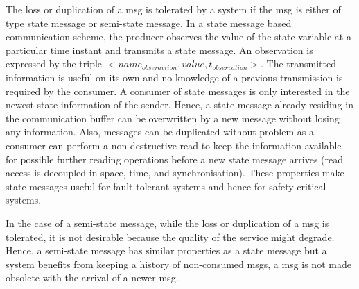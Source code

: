 The loss or duplication of a \gls*{msg} is tolerated by a system if the \gls*{msg} is either of type state message or semi-state message.
In a state message based communication scheme, the producer observes the value of the state variable at a particular time instant and transmits a state message.
An observation is expressed by the triple $<name_{obseravtion}, value, t_{observation}>$.
The transmitted information is useful on its own and no knowledge of a previous transmission is required by the consumer.
A consumer of state messages is only interested in the newest state information of the sender.
Hence, a state message already residing in the communication buffer can be overwritten by a new message without losing any information.
Also, messages can be duplicated without problem as a consumer can perform a non-destructive read to keep the information available for possible further reading operations before a new state message arrives (read access is decoupled in space, time, and synchronisation).
These properties make state messages useful for fault tolerant systems and hence for safety-critical systems.

In the case of a semi-state message, while the loss or duplication of a \gls*{msg} is tolerated, it is not desirable because the quality of the service might degrade.
Hence, a semi-state message has similar properties as a state message but a system benefits from keeping a history of non-consumed \glspl*{msg}, \ie a \gls*{msg} is not made obsolete with the arrival of a newer \gls*{msg}.

